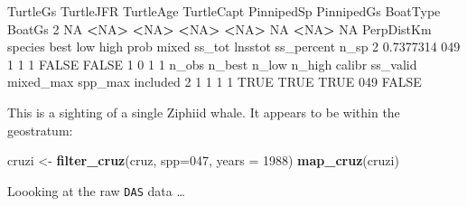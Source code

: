 \documentclass[
]{book}
\newenvironment{Shaded}{\begin{snugshade}}{\end{snugshade}}
\newcommand{\AttributeTok}[1]{\textcolor[rgb]{0.13,0.29,0.53}{#1}}
\newcommand{\ConstantTok}[1]{\textcolor[rgb]{0.56,0.35,0.01}{#1}}
\newcommand{\DecValTok}[1]{\textcolor[rgb]{0.00,0.00,0.81}{#1}}
\newcommand{\ErrorTok}[1]{\textcolor[rgb]{0.64,0.00,0.00}{\textbf{#1}}}
\newcommand{\FloatTok}[1]{\textcolor[rgb]{0.00,0.00,0.81}{#1}}
\newcommand{\FunctionTok}[1]{\textcolor[rgb]{0.13,0.29,0.53}{\textbf{#1}}}
\newcommand{\NormalTok}[1]{#1}
\newcommand{\OtherTok}[1]{\textcolor[rgb]{0.56,0.35,0.01}{#1}}
\newcommand{\SpecialCharTok}[1]{\textcolor[rgb]{0.81,0.36,0.00}{\textbf{#1}}}
\newcommand{\StringTok}[1]{\textcolor[rgb]{0.31,0.60,0.02}{#1}}
\begin{document}
\begin{Shaded}
\begin{Highlighting}[]
\NormalTok{  TurtleGs TurtleJFR TurtleAge TurtleCapt PinnipedSp PinnipedGs BoatType BoatGs}
\DecValTok{2}       \ConstantTok{NA}      \SpecialCharTok{\textless{}}\ConstantTok{NA}\SpecialCharTok{\textgreater{}}      \ErrorTok{\textless{}}\ConstantTok{NA}\SpecialCharTok{\textgreater{}}       \ErrorTok{\textless{}}\ConstantTok{NA}\SpecialCharTok{\textgreater{}}       \ErrorTok{\textless{}}\ConstantTok{NA}\SpecialCharTok{\textgreater{}}         \ConstantTok{NA}     \SpecialCharTok{\textless{}}\ConstantTok{NA}\SpecialCharTok{\textgreater{}}     \ConstantTok{NA}
\NormalTok{  PerpDistKm species best low high  prob mixed ss\_tot lnsstot ss\_percent n\_sp}
\DecValTok{2}  \FloatTok{0.7377314}     \DecValTok{049}    \DecValTok{1}   \DecValTok{1}    \DecValTok{1} \ConstantTok{FALSE} \ConstantTok{FALSE}      \DecValTok{1}       \DecValTok{0}          \DecValTok{1}    \DecValTok{1}
\NormalTok{  n\_obs n\_best n\_low n\_high calibr ss\_valid mixed\_max spp\_max included}
\DecValTok{2}     \DecValTok{1}      \DecValTok{1}     \DecValTok{1}      \DecValTok{1}   \ConstantTok{TRUE}     \ConstantTok{TRUE}      \ConstantTok{TRUE}     \DecValTok{049}    \ConstantTok{FALSE}
\end{Highlighting}
\end{Shaded}

This is a sighting of a single Ziphiid whale. It appears to be within the geostratum:

\begin{Shaded}
\begin{Highlighting}[]
\NormalTok{cruzi }\OtherTok{\textless{}{-}} \FunctionTok{filter\_cruz}\NormalTok{(cruz, }\AttributeTok{spp=}\StringTok{\textquotesingle{}047\textquotesingle{}}\NormalTok{, }\AttributeTok{years =} \DecValTok{1988}\NormalTok{)}
\FunctionTok{map\_cruz}\NormalTok{(cruzi)}
\end{Highlighting}
\end{Shaded}

Loooking at the raw \texttt{DAS} data \ldots{}
\end{document}
